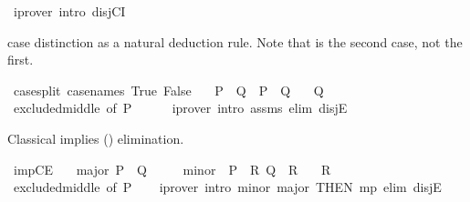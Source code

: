 \begin{isabellebody}
\ {\isacharparenleft}{\kern0pt}iprover\ intro{\isacharcolon}{\kern0pt}\ disjCI{\isacharparenright}{\kern0pt}%
\endisatagproof
{\isafoldproof}%
%
\isadelimproof
%
\endisadelimproof
%
\begin{isamarkuptext}%
case distinction as a natural deduction rule.
  Note that  is the second case, not the first.%
\end{isamarkuptext}\isamarkuptrue%
\isamarkupfalse%
\ case{\isacharunderscore}{\kern0pt}split\ {\isacharbrackleft}{\kern0pt}case{\isacharunderscore}{\kern0pt}names\ True\ False{\isacharbrackright}{\kern0pt}{\isacharcolon}{\kern0pt}\isanewline
\ \ \ {\isachardoublequoteopen}P\ {\isasymLongrightarrow}\ Q{\isachardoublequoteclose}\ {\isachardoublequoteopen}{\isasymnot}\ P\ {\isasymLongrightarrow}\ Q{\isachardoublequoteclose}\isanewline
\ \ \ Q\isanewline
%
\isadelimproof
\ \ %
\endisadelimproof
%
\isatagproof
{}\isamarkupfalse%
\ excluded{\isacharunderscore}{\kern0pt}middle\ {\isacharbrackleft}{\kern0pt}of\ P{\isacharbrackright}{\kern0pt}\isanewline
\ \ \ \ \isamarkupfalse%
\ {\isacharparenleft}{\kern0pt}iprover\ intro{\isacharcolon}{\kern0pt}\ assms\ elim{\isacharcolon}{\kern0pt}\ disjE{\isacharparenright}{\kern0pt}%
\endisatagproof
{\isafoldproof}%
%
\isadelimproof
%
\endisadelimproof
%
\begin{isamarkuptext}%
Classical implies (\isa{{\isasymlongrightarrow}}) elimination.%
\end{isamarkuptext}\isamarkuptrue%
\isamarkupfalse%
\ impCE{\isacharcolon}{\kern0pt}\isanewline
\ \ \ major{\isacharcolon}{\kern0pt}\ {\isachardoublequoteopen}P\ {\isasymlongrightarrow}\ Q{\isachardoublequoteclose}\isanewline
\ \ \ \ \ minor{\isacharcolon}{\kern0pt}\ {\isachardoublequoteopen}{\isasymnot}\ P\ {\isasymLongrightarrow}\ R{\isachardoublequoteclose}\ {\isachardoublequoteopen}Q\ {\isasymLongrightarrow}\ R{\isachardoublequoteclose}\isanewline
\ \ \ R\isanewline
%
\isadelimproof
\ \ %
\endisadelimproof
%
\isatagproof
{}\isamarkupfalse%
\ excluded{\isacharunderscore}{\kern0pt}middle\ {\isacharbrackleft}{\kern0pt}of\ P{\isacharbrackright}{\kern0pt}\isanewline
\ \ \isamarkupfalse%
\ {\isacharparenleft}{\kern0pt}iprover\ intro{\isacharcolon}{\kern0pt}\ minor\ major\ {\isacharbrackleft}{\kern0pt}THEN\ mp{\isacharbrackright}{\kern0pt}\ elim{\isacharcolon}{\kern0pt}\ disjE{\isacharparenright}{\kern0pt}{\isacharplus}{\kern0pt}%
\endisatagproof

\end{isabellebody}

